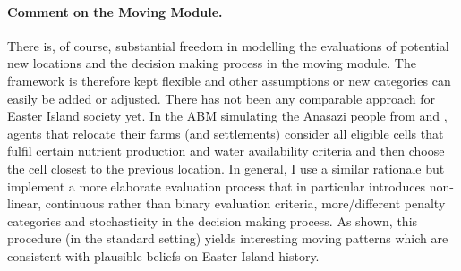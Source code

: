 \paragraph{Comment on the Moving Module.}
There is, of course, substantial freedom in modelling the evaluations of potential new locations and the decision making process in the moving module.
The framework is therefore kept flexible and other assumptions or new categories can easily be added or adjusted.
There has not been any comparable approach for Easter Island society yet.
In the ABM simulating the Anasazi people from \citet{Axtell2002} and \citet{Janssen2009}, agents that relocate their farms (and settlements) consider all eligible cells that fulfil certain nutrient production and water availability criteria and then choose the cell closest to the previous location.
In general, I use a similar rationale but implement a more elaborate evaluation process that in particular introduces non-linear, continuous rather than binary evaluation criteria, more/different penalty categories and stochasticity in the decision making process.  
As shown, this procedure (in the standard setting) yields interesting moving patterns which are consistent with plausible beliefs on Easter Island history.



